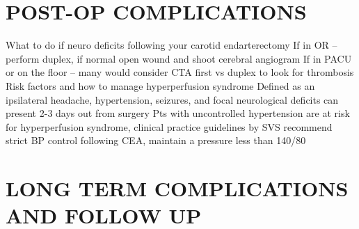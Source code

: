 \documentclass[
]{book}
\theoremstyle{definition}
\theoremstyle{definition}
\theoremstyle{definition}
\theoremstyle{definition}
\theoremstyle{remark}
\begin{document}
\hypertarget{post-op-complications}{%
\section{POST-OP COMPLICATIONS}\label{post-op-complications}}

What to do if neuro deficits following your carotid endarterectomy If in
OR -- perform duplex, if normal open wound and shoot cerebral angiogram
If in PACU or on the floor -- many would consider CTA first vs duplex to
look for thrombosis Risk factors and how to manage hyperperfusion
syndrome Defined as an ipsilateral headache, hypertension, seizures, and
focal neurological deficits can present 2-3 days out from surgery Pts
with uncontrolled hypertension are at risk for hyperperfusion syndrome,
clinical practice guidelines by SVS recommend strict BP control
following CEA, maintain a pressure less than 140/80

\hypertarget{long-term-complications-and-follow-up}{%
\section{LONG TERM COMPLICATIONS AND FOLLOW UP}\label{long-term-complications-and-follow-up}}
\end{document}
